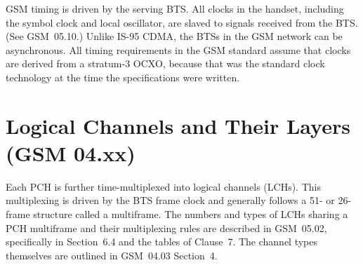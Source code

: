 \documentclass[11pt]{book}
\begin{document}
GSM timing is driven by the serving BTS. All clocks in the handset, including the symbol clock and local oscillator, are slaved to signals received from the BTS. (See GSM~05.10.) Unlike IS-95 CDMA, the BTSs in the GSM network can be asynchronous.  All timing requirements in the GSM standard assume that clocks are derived from a stratum-3 OCXO, because that was the standard clock technology at the time the specifications were written.

\section{Logical Channels and Their Layers (GSM 04.xx)}
Each PCH is further time-multiplexed into logical channels (LCHs). This multiplexing is driven by the BTS frame clock and generally follows a 51- or 26-frame structure called a multiframe. The numbers and types of LCHs sharing a PCH multiframe and their multiplexing rules are described in GSM~05.02, specifically in Section~6.4 and the tables of Clause~7. The channel types themselves are outlined in GSM~04.03 Section~4.
\end{document}
